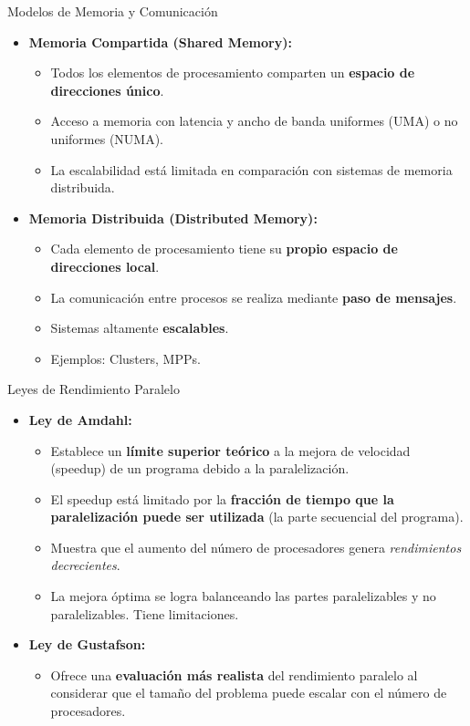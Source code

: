 \begin{frame}{Modelos de Memoria y Comunicación}
  \begin{itemize}
    \item \textbf{Memoria Compartida (Shared Memory):}
    \begin{itemize}
      \item Todos los elementos de procesamiento comparten un \textbf{espacio de direcciones único}.
      \item Acceso a memoria con latencia y ancho de banda uniformes (UMA) o no uniformes (NUMA).
      \item La escalabilidad está limitada en comparación con sistemas de memoria distribuida.
    \end{itemize}
    \item \textbf{Memoria Distribuida (Distributed Memory):}
    \begin{itemize}
      \item Cada elemento de procesamiento tiene su \textbf{propio espacio de direcciones local}.
      \item La comunicación entre procesos se realiza mediante \textbf{paso de mensajes}.
      \item Sistemas altamente \textbf{escalables}.
      \item Ejemplos: Clusters, MPPs.
    \end{itemize}
  \end{itemize}
\end{frame}

\begin{frame}{Leyes de Rendimiento Paralelo}
  \begin{itemize}
    \item \textbf{Ley de Amdahl:}
    \begin{itemize}
      \item Establece un \textbf{límite superior teórico} a la mejora de velocidad (speedup) de un programa debido a la paralelización.
      \item El speedup está limitado por la \textbf{fracción de tiempo que la paralelización puede ser utilizada} (la parte secuencial del programa).
      \item Muestra que el aumento del número de procesadores genera \emph{rendimientos decrecientes}.
      \item La mejora óptima se logra balanceando las partes paralelizables y no paralelizables. Tiene limitaciones.
    \end{itemize}
    \item \textbf{Ley de Gustafson:}
    \begin{itemize}
      \item Ofrece una \textbf{evaluación más realista} del rendimiento paralelo al considerar que el tamaño del problema puede escalar con el número de procesadores.
    \end{itemize}
  \end{itemize}
\end{frame}

